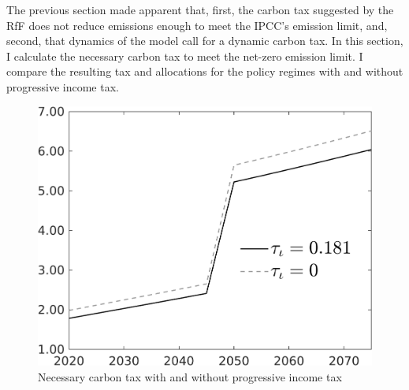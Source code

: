  The previous section made apparent that, first, the carbon tax suggested by the RfF does not reduce emissions enough to meet the IPCC's emission limit, and, second, that dynamics of the model call for a dynamic carbon tax. In this section, I calculate the necessary carbon tax to meet the net-zero emission limit. I compare the resulting tax and allocations for the policy regimes with and without progressive income tax. 
 

 \begin{figure}[h!!]
 	\centering
 	\caption{Necessary carbon tax with and without progressive income tax  }\label{fig:Limit_nsk0_xgr0_know}		
 	\begin{minipage}[]{0.32\textwidth}
 		\includegraphics[width=1\textwidth]{../../codding_model/own_basedOnFried/optimalPol_010922_revision/figures/all_13Sept22/CompTauf_bytaul_Reg0_tauf_spillover0_nsk0_xgr0_knspil0_sep0_LFlimit1_emsbase0_countec0_GovRev0_etaa0.79_lgd1.png}
 	\end{minipage}		\begin{minipage}[]{0.32\textwidth}

\end{minipage}
\end{figure}
